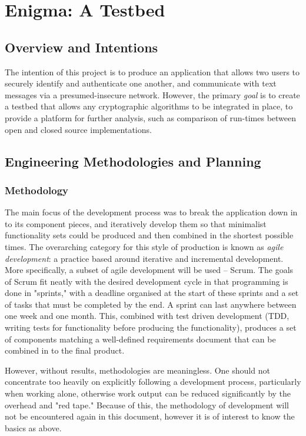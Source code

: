 
\chapter{Enigma: A Testbed} 
\label{Chapter6}

\section{Overview and Intentions}

The intention of this project is to produce an application that allows two users to securely identify and authenticate one another, and communicate with text messages via a presumed-insecure network. However, the primary \emph{goal} is to create a testbed that allows any cryptographic algorithms to be integrated in place, to provide a platform for further analysis, such as comparison of run-times between open and closed source implementations.

\section{Engineering Methodologies and Planning}

\subsection{Methodology}

The main focus of the development process was to break the application down in to its component pieces, and iteratively develop them so that minimalist functionality sets could be produced and then combined in the shortest possible times. The overarching category for this style of production is known as \emph{agile development}: a practice based around iterative and incremental development. More specifically, a subset of agile development will be used -- Scrum. The goals of Scrum fit neatly with the desired development cycle in that programming is done in "sprints," with a deadline organised at the start of these sprints and a set of tasks that must be completed by the end. A sprint can last anywhere between one week and one month. This, combined with test driven development (TDD, writing tests for functionality before producing the functionality), produces a set of components matching a well-defined requirements document that can be combined in to the final product.

However, without results, methodologies are meaningless. One should not concentrate too heavily on explicitly following a development process, particularly when working alone, otherwise work output can be reduced significantly by the overhead and "red tape." Because of this, the methodology of development will not be encountered again in this document, however it is of interest to know the basics as above.

